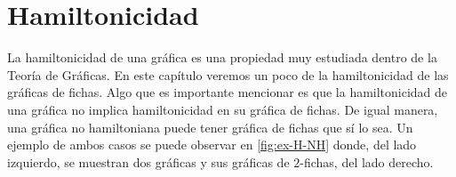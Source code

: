 \chapter{Hamiltonicidad}%
\label{cap:hamilt}

La hamiltonicidad de una gr\'afica es una propiedad muy estudiada dentro de la
Teor\'ia de Gr\'aficas. En este cap\'itulo veremos un poco de la hamiltonicidad
de las gr\'aficas de fichas. Algo que es importante mencionar es que la
hamiltonicidad de una gr\'afica no implica hamiltonicidad en su gr\'afica de
fichas. De igual manera, una gr\'afica no hamiltoniana puede tener gr\'afica de
fichas que s\'i lo sea. Un ejemplo de ambos casos se puede observar en
\cref{fig:ex-H-NH} donde, del lado izquierdo, se muestran dos gr\'aficas y sus
gr\'aficas de $2$-fichas, del lado derecho.


